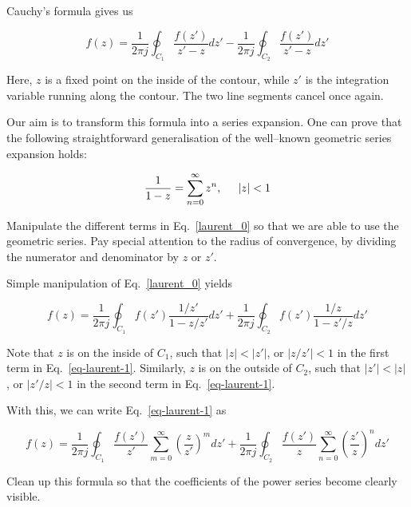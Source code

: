 Cauchy's formula gives us

\begin{equation}
f(z)=\frac{1}{2 \pi j }\oint_{{C}_1} \frac{f(z')} {z'-z} dz' -\frac{1}{2
\pi j }\oint_{{C}_2} \frac{f(z')} {z'-z} dz' \label{laurent_0}
\end{equation} 

Here, $z$ is a fixed point on the inside of the contour, while $z'$ is the integration variable running along the contour. The two line segments cancel once again.

Our aim is to transform this formula into a series expansion. One can prove that the following straightforward generalisation of the well--known geometric series expansion holds:

\begin{equation}
\frac{1}{1-z} = \sum_{n=0}^\infty z^n, \hspace{.5cm} |z| < 1
\end{equation}

\begin{cue}
Manipulate the different terms in Eq.~\ref{laurent_0} so that we are able to use the geometric series. Pay special attention to the radius of convergence, by dividing the numerator and denominator by $z$ or $z'$.
\end{cue}

Simple manipulation of Eq.~\ref{laurent_0} yields

\begin{equation}
f(z)=\frac{1}{2 \pi j }\oint_{{C}_1} f(z') \frac{1 / z'} {1-z / z'} dz' + \frac{1}{2 \pi j }\oint_{{C}_2} f(z') \frac{1 / z} {1 - z' / z} dz'
\label{eq-laurent-1}
\end{equation} 

Note that $z$ is on the inside of ${C}_1$, such that $| z | < |z'| $, or $ |z / z' | < 1$ in the first term in Eq.~\ref{eq-laurent-1}. Similarly, $z$ is on the outside of ${C}_2$, such that $|z'| < | z | $, or $ |z'  / z| <
1$ in the second term in Eq.~\ref{eq-laurent-1}.

With this, we can write Eq.~\ref{eq-laurent-1} as

\begin{equation}
f(z)=\frac{1}{2 \pi j }\oint_{{C}_1} \frac{f(z')}{z'} \sum_{m=0}^{\infty} \left( \frac{z}{z'}\right)^m dz' + \frac{1}{2 \pi j }\oint_{{C}_2} \frac{f(z')}{z} \sum_{n=0}^{\infty} \left(\frac{z'}{z}\right)^n dz'
\end{equation}

\begin{cue}
Clean up this formula so that the coefficients of the power series become clearly visible.
\end{cue}


